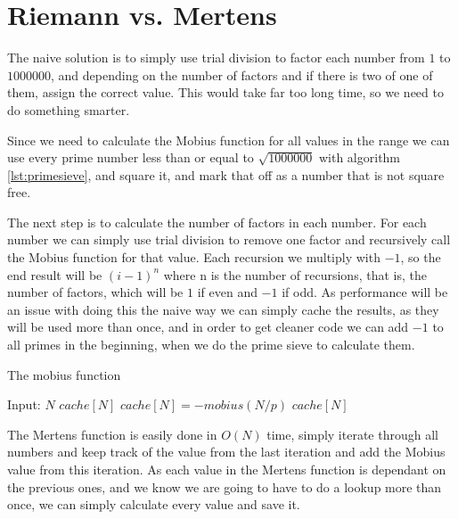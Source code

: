 \documentclass[11pt,a4paper,twoside]{article}
\begin{document}

\section{Riemann vs. Mertens}

The naive solution is to simply use trial division to factor each number from
$1$ to $1000000$, and depending on the number of factors and if there is two of
one of them, assign the correct value. This would take far too long time, so we
need to do something smarter.

Since we need to calculate the Mobius function for all values in the range we
can use every prime number less than or equal to $\sqrt{1000000}$ with
algorithm \ref{lst:primesieve}, and square it, and mark that off as a number
that is not square free.

The next step is to calculate the number of factors in each number. For each
number we can simply use trial division to remove one factor and recursively
call the Mobius function for that value. Each recursion we multiply with $-1$,
so the end result will be $(i-1)^n$ where n is the number of recursions, that
is, the number of factors, which will be $1$ if even and $-1$ if odd. As
performance will be an issue with doing this the naive way we can simply cache
the results, as they will be used more than once, and in order to get cleaner
code we can add $-1$ to all primes in the beginning, when we do the prime sieve
to calculate them.

\begin{algorithm}
    \label{mobius}
    \caption{The mobius function}
    \begin{algorithmic}
        \REQUIRE Input: $N$
            \RETURN $cache[N]$
        \ENDIF
                \STATE $cache[N] = - mobius(N/p)$
                \RETURN $cache[N]$
            \ENDIF
        \ENDFOR
    \end{algorithmic}
\end{algorithm}

The Mertens function is easily done in $O(N)$ time, simply iterate through all
numbers and keep track of the value from the last iteration and add the Mobius
value from this iteration. As each value in the Mertens function is dependant
on the previous ones, and we know we are going to have to do a lookup more than
once, we can simply calculate every value and save it.
\end{document}
